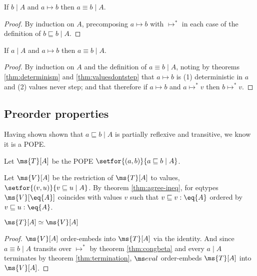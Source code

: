 \documentclass{article}
\newcommand{\ale}{\sqsubseteq}
\newcommand{\aeq}{\equiv}
\newcommand{\ordeq}{\simeq}
\newcommand{\step}{\mapsto}
\newcommand{\steps}{\step^*}
\newcommand{\lr}[2]{#2\mathrel{|}#1}
\newcommand{\lrof}[1]{\ms{T}[#1]}
\newcommand{\Val}[1]{\ms{V}[#1]}
\begin{document}
\begin{lemma}
  If $\lr{A}{b}$ and $a \step b$ then $\lr{A}{a \aeq b}$.
\end{lemma}

\begin{proof}
  By induction on $A$, precomposing $a \step b$ with $\steps$ in each case of
  the definition of $\lr{A}{b \ale b}$.
\end{proof}

\begin{lemma}
  If $\lr{A}{a}$ and $a \step b$ then $\lr{A}{a \aeq b}$.
\end{lemma}

\begin{proof}
  By induction on $A$ and the definition of $\lr{A}{a \aeq b}$, noting by
  theorems \ref{thm:determinism} and \ref{thm:valuesdontstep} that $a \step b$
  is (1) deterministic in $a$ and (2) values never step; and that therefore if
  $a \step b$ and $a \steps v$ then $b \steps v$.
\end{proof}


\subsection{Preorder properties}

Having shown shown that $\lr{A}{a \ale b}$ is partially reflexive and
transitive, we know it is a POPE.
\begin{definition}
  Let $\lrof{A}$ be the POPE $\setfor{(a,b)}{\lr{A}{a \ale b}}$.
\end{definition}

\begin{definition}
  Let $\Val{A}$ be the restriction of $\lrof{A}$ to values,
  $\setfor{(v,u)}{\lr{A}{v \ale u}}$. By theorem \ref{thm:agree-ineq}, for
  eqtypes $\Val{\eq{A}}$ coincides with values $v$ such that $v \ale v : \eq{A}$
  ordered by $v \ale u : \eq{A}$.
\end{definition}

\begin{theorem}
  $\lrof{A} \ordeq \Val{A}$
\end{theorem}
\begin{proof}
  $\Val{A}$ order-embeds into $\lrof{A}$ via the identity. And since $\lr{A}{a
    \equiv b}$ transits over $\steps$ by theorem \ref{thm:congbeta} and every
  $\lr{A}{a}$ terminates by theorem \ref{thm:termination}, $\evalfn$
  order-embeds $\lrof{A}$ into $\Val{A}$.
\end{proof}
\end{document}
